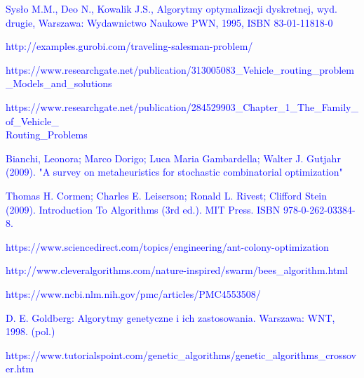 \documentclass[a4paper, twoside, 12pt, justified]{article}
\begin{document}
	 
	 
	 
	 
	 
	 
	 
	 
	
	
	
	\newpage
	\renewcommand\refname{Źródła}
	\begin{thebibliography}{}

		{\hypertarget{komiwojazer}{\textcolor{blue}{
		Sysło M.M., Deo N., Kowalik J.S., Algorytmy optymalizacji dyskretnej, wyd. drugie, Warszawa: Wydawnictwo Naukowe PWN, 1995, ISBN 83-01-11818-0}}}
	
		{\hypertarget{tsp_math_model}{\textcolor{blue}{
		http://examples.gurobi.com/traveling-salesman-problem/}}}
	
	 
	 	{\hypertarget{vrp_all}{\textcolor{blue}{
		https://www.researchgate.net/publication/313005083\_Vehicle\_routing\_problem\_Models\_and\_solutions}}}
		
		{\hypertarget{cvrp-irnich}{\textcolor{blue}{https://www.researchgate.net/publication/284529903\_Chapter\_1\_The\_Family\_of\_Vehicle\_\\Routing\_Problems}}}
		
		{\hypertarget{metaheurystyka}{\textcolor{blue}{Bianchi, Leonora; Marco Dorigo; Luca Maria Gambardella; Walter J. Gutjahr (2009). "A survey on metaheuristics for stochastic combinatorial optimization"}}}
		
		{\hypertarget{algorithm}{\textcolor{blue}{
		Thomas H. Cormen; Charles E. Leiserson; Ronald L. Rivest; Clifford Stein (2009). Introduction To Algorithms (3rd ed.). MIT Press. ISBN 978-0-262-03384-8.}}}
		
		
		{\hypertarget{ant}{\textcolor{blue}{
		https://www.sciencedirect.com/topics/engineering/ant-colony-optimization}}}
	
		{\hypertarget{bees}{\textcolor{blue}{
		http://www.cleveralgorithms.com/nature-inspired/swarm/bees\_algorithm.html}}}
	
		{\hypertarget{bees_code}{\textcolor{blue}{
		https://www.ncbi.nlm.nih.gov/pmc/articles/PMC4553508/}}}

		
		{\hypertarget{ag}{\textcolor{blue}{
		D. E. Goldberg: Algorytmy genetyczne i ich zastosowania. Warszawa: WNT, 1998. (pol.)}}}
	
		{\hypertarget{cross}{\textcolor{blue}{
		https://www.tutorialspoint.com/genetic\_algorithms/genetic\_algorithms\_crossover.htm}}}
	

\end{thebibliography}
\end{document}
